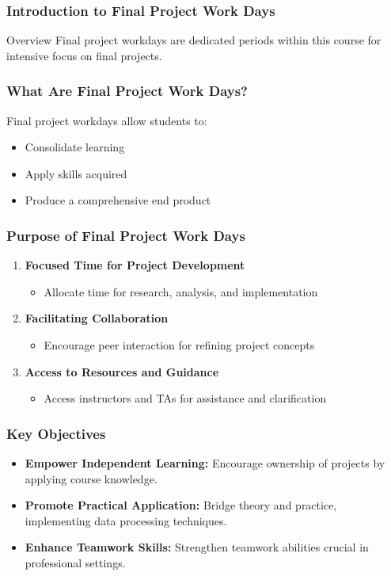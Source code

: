 \documentclass[aspectratio=169]{beamer}
\begin{document}
\frame{\titlepage}

\begin{frame}[fragile]
    \frametitle{Introduction to Final Project Work Days}
    \begin{block}{Overview}
        Final project workdays are dedicated periods within this course for intensive focus on final projects.
    \end{block}
\end{frame}

\begin{frame}[fragile]
    \frametitle{What Are Final Project Work Days?}
    Final project workdays allow students to:
    \begin{itemize}
        \item Consolidate learning
        \item Apply skills acquired
        \item Produce a comprehensive end product
    \end{itemize}
\end{frame}

\begin{frame}[fragile]
    \frametitle{Purpose of Final Project Work Days}
    \begin{enumerate}
        \item \textbf{Focused Time for Project Development}
        \begin{itemize}
            \item Allocate time for research, analysis, and implementation
        \end{itemize}
        \item \textbf{Facilitating Collaboration}
        \begin{itemize}
            \item Encourage peer interaction for refining project concepts
        \end{itemize}
        \item \textbf{Access to Resources and Guidance}
        \begin{itemize}
            \item Access instructors and TAs for assistance and clarification
        \end{itemize}
    \end{enumerate}
\end{frame}

\begin{frame}[fragile]
    \frametitle{Key Objectives}
    \begin{itemize}
        \item \textbf{Empower Independent Learning:}
        Encourage ownership of projects by applying course knowledge.
        \item \textbf{Promote Practical Application:}
        Bridge theory and practice, implementing data processing techniques.
        \item \textbf{Enhance Teamwork Skills:}
        Strengthen teamwork abilities crucial in professional settings.
    \end{itemize}
\end{frame}
\end{document}
